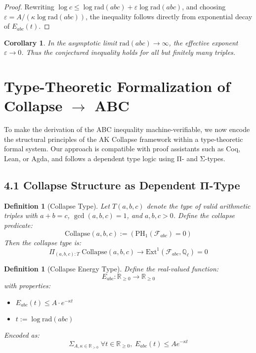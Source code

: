 \documentclass[11pt]{article}
\newtheorem{definition}[theorem]{Definition}
\newtheorem{corollary}[theorem]{Corollary}
\begin{document}
\begin{proof}
Rewriting \( \log c \leq \log \mathrm{rad}(abc) + \varepsilon \log \mathrm{rad}(abc) \), and choosing \( \varepsilon = A / (\kappa \log \mathrm{rad}(abc)) \), the inequality follows directly from exponential decay of \( E_{abc}(t) \).
\end{proof}

\begin{corollary}
In the asymptotic limit \( \mathrm{rad}(abc) \to \infty \), the effective exponent \( \varepsilon \to 0 \). Thus the conjectured inequality holds for all but finitely many triples.
\end{corollary}



\section{Type-Theoretic Formalization of Collapse \texorpdfstring{$\to$}{→} ABC}

To make the derivation of the ABC inequality machine-verifiable, we now encode the structural principles of the AK Collapse framework within a type-theoretic formal system. Our approach is compatible with proof assistants such as Coq, Lean, or Agda, and follows a dependent type logic using Π- and Σ-types.

\subsection{4.1 Collapse Structure as Dependent Π-Type}

\begin{definition}[Collapse Type]
Let \( T(a,b,c) \) denote the type of valid arithmetic triples with \( a+b=c \), \( \gcd(a,b,c)=1 \), and \( a,b,c > 0 \). Define the collapse predicate:
\[
\mathrm{Collapse}(a,b,c) := \left( \mathrm{PH}_1(\mathcal{F}_{abc}) = 0 \right)
\]
Then the collapse type is:
\[
\Pi_{(a,b,c):T} \; \mathrm{Collapse}(a,b,c) \to \mathrm{Ext}^1(\mathcal{F}_{abc}, \mathbb{Q}_\ell) = 0
\]
\end{definition}

\begin{definition}[Collapse Energy Type]
Define the real-valued function:
\[
E_{abc} : \mathbb{R}_{\geq 0} \to \mathbb{R}_{\geq 0}
\]
with properties:
\begin{itemize}
    \item \( E_{abc}(t) \leq A \cdot e^{-\kappa t} \)
    \item \( t := \log \mathrm{rad}(abc) \)
\end{itemize}
Encoded as:
\[
\Sigma_{A, \kappa \in \mathbb{R}_{>0}} \; \forall t \in \mathbb{R}_{\geq 0},\; E_{abc}(t) \leq A e^{-\kappa t}
\]
\end{definition}
\end{document}
